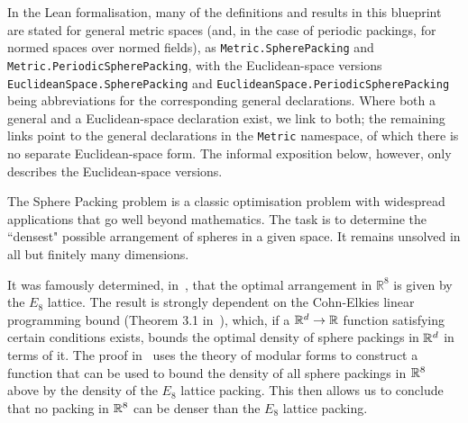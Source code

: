 \begin{remark}
  In the Lean formalisation, many of the definitions and results in this blueprint are stated for general metric spaces (and, in the case of periodic packings, for normed spaces over normed fields), as \verb|Metric.SpherePacking| and \verb|Metric.PeriodicSpherePacking|, with the Euclidean-space versions \verb|EuclideanSpace.SpherePacking| and \verb|EuclideanSpace.PeriodicSpherePacking| being abbreviations for the corresponding general declarations. Where both a general and a Euclidean-space declaration exist, we link to both; the remaining links point to the general declarations in the \verb|Metric| namespace, of which there is no separate Euclidean-space form. The informal exposition below, however, only describes the Euclidean-space versions.
\end{remark}

The Sphere Packing problem is a classic optimisation problem with widespread applications that go well beyond mathematics. The task is to determine the ``densest" possible arrangement of spheres in a given space. It remains unsolved in all but finitely many dimensions.

It was famously determined, in~\cite{Via2017}, that the optimal arrangement in $\mathbb{R}^8$ is given by the $E_8$ lattice. The result is strongly dependent on the Cohn-Elkies linear programming bound (Theorem 3.1 in~\cite{ElkiesCohn}), which, if a $\mathbb{R}^d \to \mathbb{R}$ function satisfying certain conditions exists, bounds the optimal density of sphere packings in $\mathbb{R}^d$ in terms of it. The proof in~\cite{Via2017} uses the theory of modular forms to construct a function that can be used to bound the density of all sphere packings in $\mathbb{R}^8$ above by the density of the $E_8$ lattice packing. This then allows us to conclude that no packing in $\mathbb{R}^8$ can be denser than the $E_8$ lattice packing.

